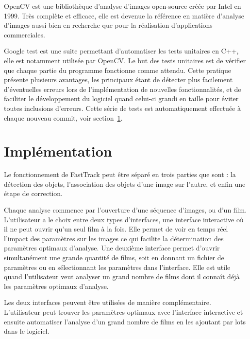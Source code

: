 	OpenCV est une bibliothèque d'analyse d'images open-source créée par Intel en 1999. Très complète et efficace, elle est devenue la référence en matière d'analyse d'images aussi bien en recherche que pour la réalisation d'applications commerciales.
\medbreak
	
	Google test est une suite permettant d'automatiser les tests unitaires en C++, elle est notamment utilisée par OpenCV. Le but des tests unitaires est de vérifier que chaque partie du programme fonctionne comme attendu. Cette pratique présente plusieurs avantages, les principaux étant de détecter plus facilement d'éventuelles erreurs lors de l'implémentation de nouvelles fonctionnalités, et de faciliter le développement du logiciel quand celui-ci grandi en taille pour éviter toutes inclusions d'erreurs. Cette série de tests est automatiquement effectuée à chaque nouveau commit, voir section~\ref{}.
	
	\section{Implémentation}
	
	Le fonctionnement de FastTrack peut être séparé en trois parties que sont : la détection des objets, l'association des objets d'une image sur l'autre, et enfin une étape de correction.
\medbreak
	
	Chaque analyse commence par l'ouverture d'une séquence d'images, ou d'un film. L'utilisateur a le choix entre deux types d'interfaces, une interface interactive où il ne peut ouvrir qu'un seul film à la fois. Elle permet de voir en temps réel l'impact des paramètres sur les images ce qui facilite la détermination des paramètres optimaux d'analyse. Une deuxième interface permet d'ouvrir simultanément une grande quantité de films, soit en donnant un fichier de paramètres ou en sélectionnant les paramètres dans l'interface. Elle est utile quand l'utilisateur veut analyser un grand nombre de films dont il connaît déjà les paramètres optimaux d'analyse.
\medbreak
	
	Les deux interfaces peuvent être utilisées de manière complémentaire. L'utilisateur peut trouver les paramètres optimaux avec l'interface interactive et ensuite automatiser l'analyse d'un grand nombre de films en les ajoutant par lots dans le logiciel.
	
